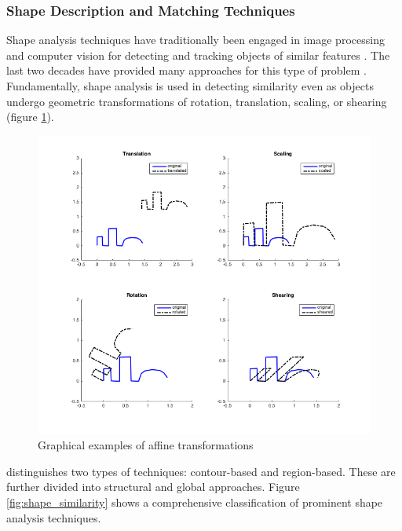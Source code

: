 \documentclass[11]{article}
\let \citeA \textcite
\begin{document}
\subsubsection{Shape Description and Matching Techniques}
Shape analysis techniques have traditionally been engaged in image processing and computer vision for detecting and tracking objects of similar features \cite{loncaric1998,zhang2004,robert2012}.
The last two decades have provided many approaches for this type of problem \cite{loncaric1998,zhang2004,veltkamp2001,robert2012}.
Fundamentally, shape analysis is used in detecting similarity even as objects undergo geometric transformations of rotation, translation, scaling, or shearing (figure \ref{fig:affine_transform}).

\begin{figure}[h]
  \centering
  \includegraphics[width=1\textwidth]{figures/affine_transform.png}
  \caption{Graphical examples of affine transformations}
  \label{fig:affine_transform}
\end{figure}       

\citeA{zhang2004} distinguishes two types of techniques: contour-based and region-based.
These are further divided into structural and global approaches.
Figure \ref{fig:shape_similarity} shows a comprehensive classification of prominent shape analysis techniques. 
\end{document}
